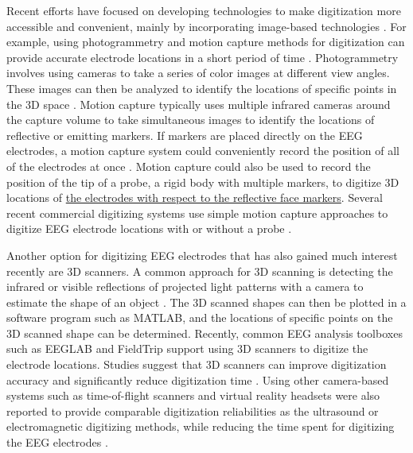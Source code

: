 \documentclass[../thesis_seyed.tex]{subfiles}
\begin{document}
Recent efforts have focused on developing technologies to make digitization more accessible and convenient, mainly by incorporating image-based technologies \cite{Koessler2010-fm,Baysal2010-zi}. For example, using photogrammetry and motion capture methods for digitization can provide accurate electrode locations in a short period of time \cite{Clausner2017-hv,Reis2015-lt}. Photogrammetry involves using cameras to take a series of color images at different view angles. These images can then be analyzed to identify the locations of specific points in the 3D space \cite{Clausner2017-hv,Russell2005-hg}. Motion capture typically uses multiple infrared cameras around the capture volume to take simultaneous images to identify the locations of reflective or emitting markers. If markers are placed directly on the EEG electrodes, a motion capture system could conveniently record the position of all of the electrodes at once \cite{Reis2015-lt,Engels2013-gm}. Motion capture could also be used to record the position of the tip of a probe, a rigid body with multiple markers, to digitize 3D locations of \ul{the electrodes with respect to the reflective face markers}. Several recent commercial digitizing systems use simple motion capture approaches to digitize EEG electrode locations with or without a probe \cite{Song2018-qz,Cline2018-qo,noauthor_undated-al,noauthor_undated-tn}.   

Another option for digitizing EEG electrodes that has also gained much interest recently are 3D scanners. A common approach for 3D scanning is detecting the infrared or visible reflections of projected light patterns with a camera to estimate the shape of an object \cite{Chen1987-py}. The 3D scanned shapes can then be plotted in a software program such as MATLAB, and the locations of specific points on the 3D scanned shape can be determined. Recently, common EEG analysis toolboxes such as EEGLAB \cite{Delorme2004-yy} and FieldTrip \cite{Oostenveld2010-ss} support using 3D scanners to digitize the electrode locations. Studies suggest that 3D scanners can improve digitization accuracy and significantly reduce digitization time \cite{Taberna2019-zv}. Using other camera-based systems such as time-of-flight scanners and virtual reality headsets were also reported to provide comparable digitization reliabilities as the ultrasound or electromagnetic digitizing methods, while reducing the time spent for digitizing the EEG electrodes \cite{Cline2018-qo,Vema_Krishna_Murthy2014-qk,Zhang2014-jh}.
\end{document}
